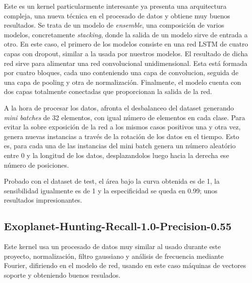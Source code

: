 Este es un kernel particularmente interesante ya presenta una arquitectura compleja, una nueva técnica en el procesado de datos y obtiene muy buenos resultados. Se trata de un modelo de \textit{ensemble}, una composición de varios modelos, concretamente \textit{stacking}, donde la salida de un modelo sirve de entrada a otro. En este caso, el primero de los modelos consiste en una red LSTM de cuatro capas con dropout, similar a la usada por nuestros modelos. El resultado de dicha red sirve para alimentar una red convolucional unidimensional. Esta está formada por cuatro bloques, cada uno conteniendo una capa de convolucion, seguida de una capa de pooling y otra de normalización. Finalmente, el modelo cuenta con dos capas totalmente conectadas que proporcionan la salida de la red.

A la hora de procesar los datos, afronta el desbalanceo del dataset generando \textit{mini batches} de 32 elementos, con igual número de elementos en cada clase. Para evitar la sobre exposición de la red a los mismos casos positivos una y otra vez, genera nuevas instancias a través de la rotación de los datos en el tiempo. Esto es, para cada una de las instancias del mini batch genera un número aleatório entre 0 y la longitud de los datos, desplazandolos luego hacia la derecha ese número de posiciones. 

Probado con el dataset de test, el área bajo la curva obtenida es de 1, la sensibilidad igualmente es de 1 y la especificidad se queda en 0.99; unos resultados impresionantes. 

\subsection{Exoplanet-Hunting-Recall-1.0-Precision-0.55 \cite{Kaggle-kernel-Exoplanet-Hunting}} 

Este kernel usa un procesado de datos muy similar al usado durante este proyecto, normalización, filtro gaussiano y análisis de frecuencia mediante Fourier, difiriendo en el modelo de red, usando en este caso máquinas de vectores soporte y obteniendo buenos resulados.

